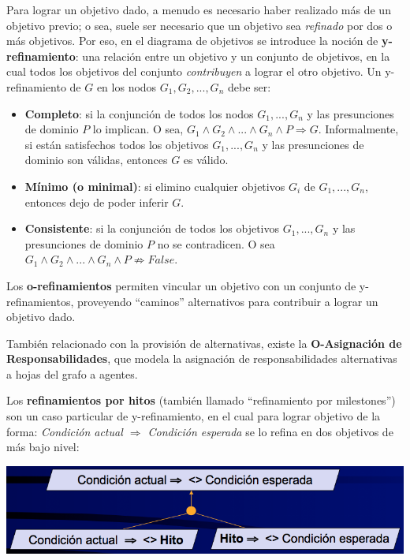 \documentclass[]{article}
\begin{document}
Para lograr un objetivo dado, a menudo es necesario haber realizado más de un objetivo previo; o sea, suele ser necesario que un objetivo sea \textit{refinado} por dos o más objetivos. Por eso, en el diagrama de objetivos se introduce la noción de \textbf{y-refinamiento}: una relación entre un objetivo y un conjunto de objetivos, en la cual todos los objetivos del conjunto \textit{contribuyen} a lograr el otro objetivo. Un y-refinamiento de $G$ en los nodos $G_1,G_2,...,G_n$ debe ser:
\begin{itemize}
	\item \textbf{Completo}: si la conjunción de todos los nodos $G_1,...,G_n$ y las presunciones de dominio $P$ lo implican. O sea, $G_1 \wedge G_2 \wedge ... \wedge G_n \wedge P \Rightarrow G$. Informalmente, si están satisfechos todos los objetivos $G_1,...,G_n$ y las presunciones de dominio son válidas, entonces $G$ es válido.
	\item \textbf{Mínimo (o minimal)}: si elimino cualquier objetivos $G_i$ de $G_1,...,G_n$, entonces dejo de poder inferir $G$.
	\item \textbf{Consistente}: si la conjunción de todos los objetivos $G_1,...,G_n$ y las presunciones de dominio $P$ no se contradicen. O sea $G_1 \wedge G_2 \wedge ... \wedge G_n \wedge P \not\Rightarrow False$.
\end{itemize}

Los \textbf{o-refinamientos} permiten vincular un objetivo con un conjunto de y-refinamientos, proveyendo ``caminos'' alternativos para contribuir a lograr un objetivo dado.

También relacionado con la provisión de alternativas, existe la \textbf{O-Asignación de Responsabilidades}, que modela la asignación de responsabilidades alternativas a hojas del grafo a agentes.

Los \textbf{refinamientos por hitos} (también llamado ``refinamiento por milestones'') son un caso particular de y-refinamiento, en el cual para lograr objetivo de la forma: \textit{Condición actual $\Rightarrow$ Condición esperada} se lo refina en dos objetivos de más bajo nivel:

\begin{center}
	\includegraphics[scale=0.5]{Hitos.png}
\end{center}
\end{document}
